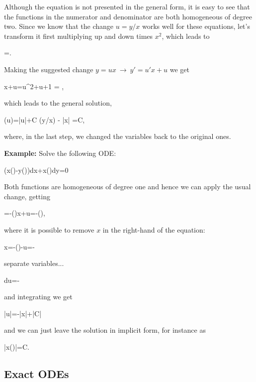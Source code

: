 Although the equation is not presented in the general form, it is easy to see that the functions in the numerator and denominator are both homogeneous of degree two. Since we know that the change $u = y/x$ works well for these equations, let's transform it first multiplying up and down times $x^2$, which leads to

\bnn
	=.
\enn

Making the suggested change $y=ux \ \rightarrow \ y'=u'x+u$ we get

\bnn
    x+u=u^2+u+1 \quad \rightarrow \int {} = \int {},
\enn

which leads to the general solution,

\bnn
	\arctan(u)=\ln |u|+C \quad \rightarrow \arctan(y/x) - \ln |x| =C,
\enn

where, in the last step, we changed the variables back to the original ones.

{\bf Example: }Solve the following ODE:

\bnn
	\left(x\sin\left(\right)-y\cos\left(\right)\right)dx+x\cos\left(\right)dy=0
\enn

 Both functions are homogeneous of degree one and hence we can apply the usual change, getting 

\bnn
	=-\left(\right)\Rightarrow{}x+u=-\left(\right),
\enn

where it is possible to remove $x$ in the right-hand of the equation:

\bnn
	x=-\left(\right)-u=-
\enn

separate variables...

\bnn
	du=-
\enn

and integrating we get

\bnn
	\ln|\sin u|=-\ln|x|+\ln|C|
\enn

and we can just leave the solution in implicit form, for instance as

\bnn
	\left|x\sin\left(\right)\right|=C.
\enn

\subsection{Exact ODEs}

